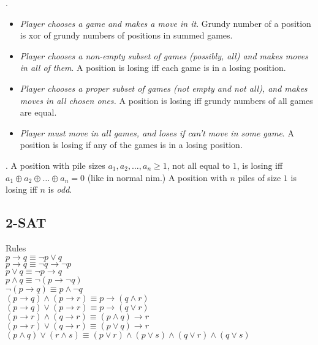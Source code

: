 .

\vspace{-4mm}
\begin{itemize}
  \item
    \emph{Player chooses a game and makes a move in it}.
    Grundy number of a position is xor of grundy numbers of positions in summed games.
  \item
    \emph{Player chooses a non-empty subset of games (possibly, all) and makes moves in all of them}.
    A position is losing iff each game is in a losing position.
  \item
    \emph{Player chooses a proper subset of games (not empty and not all),
        and makes moves in all chosen ones.}
    A position is losing iff grundy numbers of all games are equal.
  \item
    \emph{Player must move in all games, and loses if can't move in some game}.
    A position is losing if any of the games is in a losing position.
\end{itemize}

\vspace{-3mm}

.
A position with pile sizes $a_1, a_2, \dots, a_n \ge 1$,
not all equal to $1$, is losing iff $a_1 \oplus a_2 \oplus \dots \oplus a_n = 0$
(like in normal nim.)
A position with $n$ piles of size $1$ is losing iff $n$ is \emph{odd}.


\subsection{2-SAT}
 Rules \\
$ p \rightarrow q \equiv \lnot p \lor q$ \\
$ p \rightarrow q \equiv \lnot q \rightarrow \lnot p$ \\
$ p \lor q \equiv \lnot p \rightarrow q$ 	\\
$ p \land q \equiv \lnot (p \rightarrow \lnot q)$	 \\
$ \lnot (p \rightarrow q) \equiv p \land \lnot q$ \\
$ (p \rightarrow q) \land (p \rightarrow r) \equiv p \rightarrow (q \land r)$ \\
$ (p \rightarrow q) \lor (p \rightarrow r) \equiv p \rightarrow (q \lor r)$ \\
$ (p \rightarrow r) \land (q \rightarrow r) \equiv (p \land q) \rightarrow r$ \\
$ (p \rightarrow r) \lor (q \rightarrow r) \equiv (p \lor q) \rightarrow r$ \\
$(p \land q) \lor (r \land s) \equiv (p \lor r) \land (p \lor s) \land (q \lor r) \land (q \lor s)$ \\